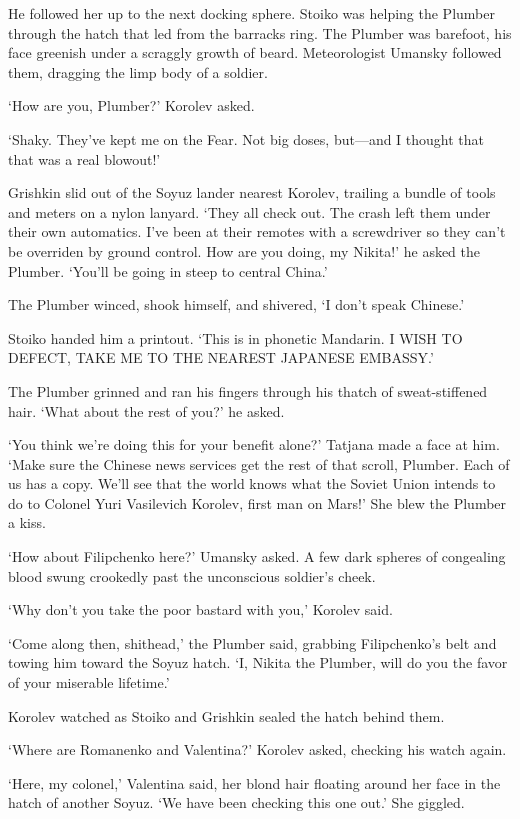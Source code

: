He followed her up to the next docking sphere. Stoiko was helping the Plumber through the hatch that led from the barracks ring. The Plumber was barefoot, his face greenish under a scraggly growth of beard. Meteorologist Umansky followed them, dragging the limp body of a soldier.

`How are you, Plumber?' Korolev asked.

`Shaky. They've kept me on the Fear. Not big doses, but---and I thought that that was a real blowout!'

Grishkin slid out of the Soyuz lander nearest Korolev, trailing a bundle of tools and meters on a nylon lanyard. `They all check out. The crash left them under their own automatics. I've been at their remotes with a screwdriver so they can't be overriden by ground control. How are you doing, my Nikita!' he asked the Plumber. `You'll be going in steep to central China.'

The Plumber winced, shook himself, and shivered, `I don't speak Chinese.'

Stoiko handed him a printout. `This is in phonetic Mandarin. I WISH TO DEFECT, TAKE ME TO THE NEAREST JAPANESE EMBASSY.'

The Plumber grinned and ran his fingers through his thatch of sweat-stiffened hair. `What about the rest of you?' he asked.

`You think we're doing this for your benefit alone?' Tatjana made a face at him. `Make sure the Chinese news services get the rest of that scroll, Plumber. Each of us has a copy. We'll see that the world knows what the Soviet Union intends to do to Colonel Yuri Vasilevich Korolev, first man on Mars!' She blew the Plumber a kiss.

`How about Filipchenko here?' Umansky asked. A few dark spheres of congealing blood swung crookedly past the unconscious soldier's cheek.

`Why don't you take the poor bastard with you,' Korolev said.

`Come along then, shithead,' the Plumber said, grabbing Filipchenko's belt and towing him toward the Soyuz hatch. `I, Nikita the Plumber, will do you the favor of your miserable lifetime.'

Korolev watched as Stoiko and Grishkin sealed the hatch behind them.

`Where are Romanenko and Valentina?' Korolev asked, checking his watch again.

`Here, my colonel,' Valentina said, her blond hair floating around her face in the hatch of another Soyuz. `We have been checking this one out.' She giggled.

